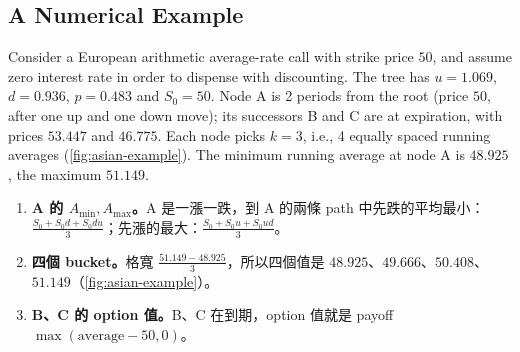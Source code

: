 \subsection{A Numerical Example}
\label{sec:asian-example}


Consider a European arithmetic average-rate call with strike price $50$, and assume zero interest rate in order to dispense with discounting.
The tree has $u=1.069$, $d=0.936$, $p=0.483$ and $S_{0}=50$.
Node A is 2 periods from the root (price $50$, after one up and one down move); its successors B and C are at expiration, with prices $53.447$ and $46.775$.
Each node picks $k=3$, i.e., 4 equally spaced running averages (\autoref{fig:asian-example}).
The minimum running average at node A is $48.925$, the maximum $51.149$.

\suppstart
{}

\begin{remark}
	\begin{enumerate}[(1),nosep]
		\item \textbf{A 的 $A_{\min},A_{\max}$。}A 是一漲一跌，到 A 的兩條 path 中先跌的平均最小：$\frac{S_{0}+S_{0}d+S_{0}du}{3}$；先漲的最大：$\frac{S_{0}+S_{0}u+S_{0}ud}{3}$。
		\item \textbf{四個 bucket。}格寬 $\frac{51.149-48.925}{3}$，所以四個值是 $48.925$、$49.666$、$50.408$、$51.149$（\autoref{fig:asian-example}）。
		\item \textbf{B、C 的 option 值。}B、C 在到期，option 值就是 payoff $\max(\text{average}-50,0)$。
	\end{enumerate}
\end{remark}
\suppend

